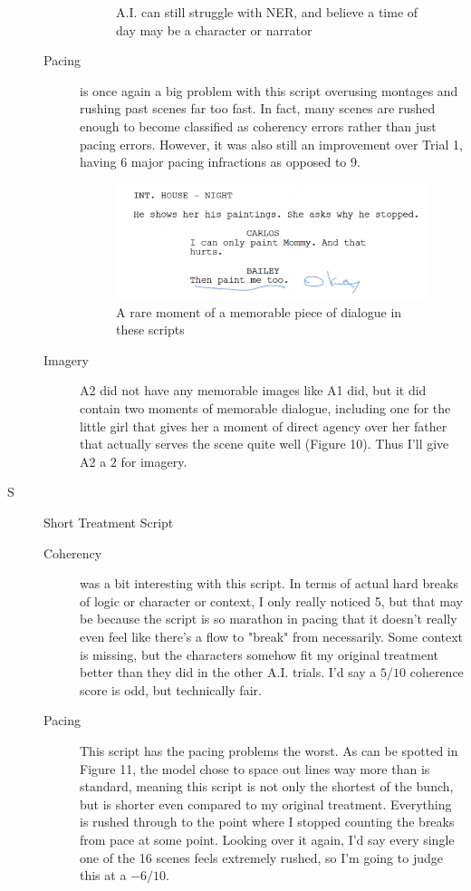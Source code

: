 \documentclass[sigconf]{acmart}
\begin{document}
\begin{description}
\begin{description}
\begin{figure}[!hbt]
            \caption{A.I. can still struggle with NER, and believe a time of day may be a character or narrator}
            \label{fig:a2-night-narrator}
        \end{figure}
        \item[Pacing] is once again a big problem with this script overusing montages and rushing past scenes far too fast. In fact, many scenes are rushed enough to become classified as coherency errors rather than just pacing errors. However, it was also still an improvement over Trial 1, having $6$ major pacing infractions as opposed to 9.
        \begin{figure}[!hbt]
            \centering
            \includegraphics[width=0.8\linewidth]{images/GoodMoment.png}
            \caption{A rare moment of a memorable piece of dialogue in these scripts}
            \label{fig:a2-dialouge}
        \end{figure}
        \item[Imagery] A2 did not have any memorable images like A1 did, but it did contain two moments of memorable dialogue, including one for the little girl that gives her a moment of direct agency over her father that actually serves the scene quite well (Figure 10). Thus I'll give A2 a $2$ for imagery.
    \end{description}
    \item[S] Short Treatment Script
    \begin{description}
        \item[Coherency] was a bit interesting with this script. In terms of actual hard breaks of logic or character or context, I only really noticed 5, but that may be because the script is so marathon in pacing that it doesn't really even feel like there's a flow to "break" from necessarily. Some context is missing, but the characters somehow fit my original treatment better than they did in the other A.I. trials. I'd say a $5/10$ coherence score is odd, but technically fair.
        \item[Pacing] This script has the pacing problems the worst. As can be spotted in Figure 11, the model chose to space out lines way more than is standard, meaning this script is not only the shortest of the bunch, but is shorter even compared to my original treatment. Everything is rushed through to the point where I stopped counting the breaks from pace at some point. Looking over it again, I'd say every single one of the 16 scenes feels extremely rushed, so I'm going to judge this at a $-6/10$.

\end{description}
\end{description}
\end{document}
